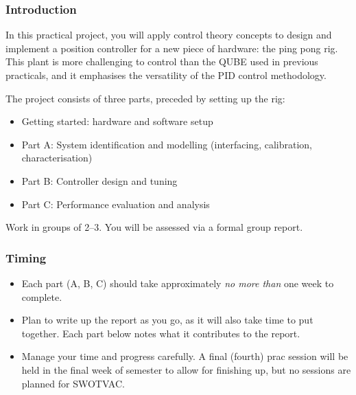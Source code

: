 \documentclass[9pt]{beamer-control}
\begin{document}

\begin{frame}
\frametitle{Introduction}
In this practical project, you will apply control theory concepts to design and implement a position controller for a new piece of hardware: the ping pong rig. This plant is more challenging to control than the QUBE used in previous practicals, and it emphasises the versatility of the PID control methodology.

\vfill

The project consists of three parts, preceded by setting up the rig:
\begin{itemize}
\item Getting started: hardware and software setup
\item Part A: System identification and modelling (interfacing, calibration, characterisation)
\item Part B: Controller design and tuning
\item Part C: Performance evaluation and analysis
\end{itemize}
Work in groups of 2--3. You will be assessed via a formal group report.

\end{frame}

\begin{frame}
\frametitle{Timing}

\begin{itemize}
\item Each part (A, B, C) should take approximately \emph{no more than} one week to complete.
\item Plan to write up the report as you go, as it will also take time to put together. Each part below notes what it contributes to the report.
\item Manage your time and progress carefully. A final (fourth) prac session will be held in the final week of semester to allow for finishing up, but no sessions are planned for SWOTVAC.
\end{itemize}
\end{frame}

\end{document}
